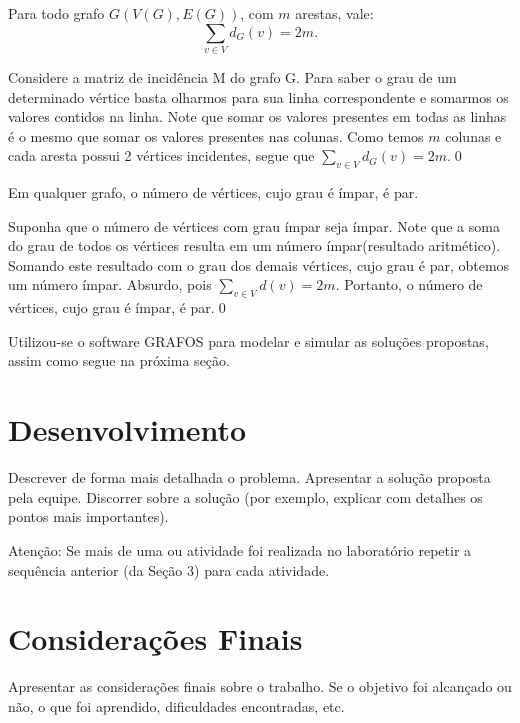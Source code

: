 \documentclass[a4paper,12pt]{article}
\begin{document}
\begin{teorema}
	Para todo grafo $G(V(G),E(G))$, com $m$ arestas, vale:
	$$
	\sum\limits_{v\in V}{d_{G}(v)=2m}.
	$$
\end{teorema}
\noindent\dem Considere a matriz de incidência M do grafo G. Para saber o grau de um determinado vértice basta olharmos para sua linha correspondente e somarmos os valores contidos na linha. Note que somar os valores presentes em todas as linhas é o mesmo que somar os valores presentes nas colunas. Como temos $m$ colunas e cada aresta possui 2 vértices incidentes, segue que $\sum\limits_{v\in V}{d_{G}(v)=2m}$.\qed

\begin{teorema}
	Em qualquer grafo, o número de vértices, cujo grau é ímpar, é par.
\end{teorema}
\noindent\dem Suponha que o número de vértices com grau ímpar seja ímpar. Note que a soma do grau de todos os vértices resulta em um número ímpar(resultado aritmético). Somando este resultado com o grau dos demais vértices, cujo grau é par, obtemos um número ímpar. Absurdo, pois $\sum\limits_{v\in V}{d(v)=2m}$. Portanto, o número de vértices, cujo grau é ímpar, é par.\qed


Utilizou-se o software GRAFOS \cite{grafos} para modelar e simular as soluções propostas, assim como segue na próxima seção.

\section{Desenvolvimento}
Descrever de forma mais detalhada o problema.
Apresentar a solução proposta pela equipe.
Discorrer sobre a solução (por exemplo, explicar com detalhes os pontos mais
importantes).

Atenção: Se mais de uma ou atividade foi realizada no laboratório repetir a sequência
anterior (da Seção 3) para cada atividade.

\section{Considerações Finais}
Apresentar as considerações finais sobre o trabalho. Se o objetivo foi alcançado ou não,
o que foi aprendido, dificuldades encontradas, etc.

\newpage
{}
{}



\end{document}
